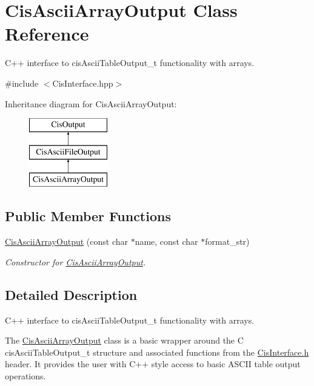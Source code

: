 \hypertarget{classCisAsciiArrayOutput}{}\section{Cis\+Ascii\+Array\+Output Class Reference}
\label{classCisAsciiArrayOutput}


C++ interface to cis\+Ascii\+Table\+Output\+\_\+t functionality with arrays.  




{\ttfamily \#include $<$Cis\+Interface.\+hpp$>$}

Inheritance diagram for Cis\+Ascii\+Array\+Output\+:\begin{figure}[H]
\begin{center}
\leavevmode
\includegraphics[height=3.000000cm]{classCisAsciiArrayOutput}
\end{center}
\end{figure}
\subsection*{Public Member Functions}
\begin{DoxyCompactItemize}
\item 
\mbox{\hyperlink{classCisAsciiArrayOutput_a3a4e19e80478aa1748f4074d72d3932a}{Cis\+Ascii\+Array\+Output}} (const char $\ast$name, const char $\ast$format\+\_\+str)
\begin{DoxyCompactList}\small\item\em Constructor for \mbox{\hyperlink{classCisAsciiArrayOutput}{Cis\+Ascii\+Array\+Output}}. \end{DoxyCompactList}\end{DoxyCompactItemize}


\subsection{Detailed Description}
C++ interface to cis\+Ascii\+Table\+Output\+\_\+t functionality with arrays. 

The \mbox{\hyperlink{classCisAsciiArrayOutput}{Cis\+Ascii\+Array\+Output}} class is a basic wrapper around the C cis\+Ascii\+Table\+Output\+\_\+t structure and associated functions from the \mbox{\hyperlink{CisInterface_8h_source}{Cis\+Interface.\+h}} header. It provides the user with C++ style access to basic A\+S\+C\+II table output operations. 

